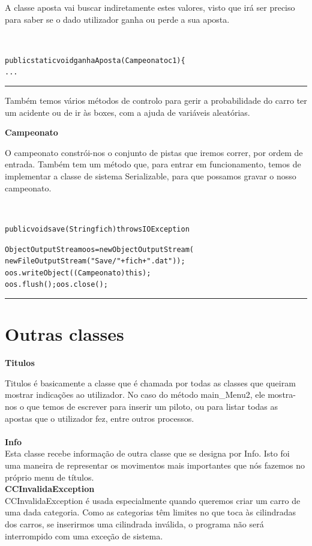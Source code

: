 \documentclass[10pt]{article}
\newenvironment{code}                    
{\textbf{
} \hspace{1cm} \hrulefill \\ 
\smallskip 
\begin{center}
\begin{minipage}{0.9\textwidth} 
\begin{alltt}\small}
{\end{alltt}
\end{minipage}
\end{center}
\hrule\smallskip
}
\begin{document}
A classe aposta vai buscar indiretamente estes valores, visto que irá ser preciso para saber se o dado utilizador ganha ou perde a sua aposta.

\begin{code}
public static void ganhaAposta(Campeonato c1)\{ 
...

\end{code}

Também temos vários métodos de controlo para gerir a probabilidade do carro ter um acidente ou de ir às boxes, com a ajuda de variáveis aleatórias.

\textbf{Campeonato}

O campeonato constrói-nos o conjunto de pistas que iremos correr, por ordem de entrada.
Também tem um método que, para entrar em funcionamento, temos de implementar a classe de sistema Serializable, para que possamos gravar o nosso campeonato.

\begin{code}
public void save(String fich) throws IOException {
        
      
      ObjectOutputStream oos = new ObjectOutputStream(
                                new FileOutputStream("Save/"+fich+".dat"));
      oos.writeObject((Campeonato) this);
      oos.flush(); oos.close();
    }
\end{code}

\section{Outras classes}
  
\textbf{Titulos}

Titulos é basicamente a classe que é chamada por todas as classes que queiram mostrar indicações ao utilizador. No caso do método main\_Menu2, ele mostra-nos o que temos de escrever para inserir um piloto, ou para listar todas as apostas que o utilizador fez, entre outros processos.
\\
\\

\textbf{Info\\}
Esta classe recebe informação de outra classe que se designa por Info. Isto foi uma maneira de representar os movimentos mais importantes que nós fazemos no próprio menu de títulos.  
\\

\textbf{CCInvalidaException\\}
CCInvalidaException é usada especialmente quando queremos criar um carro de uma dada categoria. Como as categorias têm limites no que toca às cilindradas dos carros, se inserirmos uma cilindrada inválida, o programa não será interrompido com uma exceção de sistema.
\\
\end{document}
